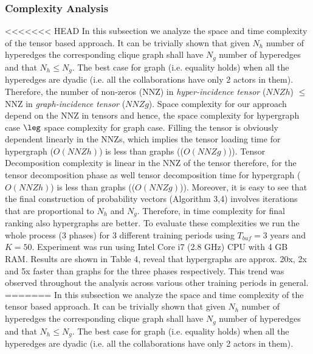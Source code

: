 \documentclass{sig-alternate}
\begin{document}

\subsubsection{Complexity Analysis}

<<<<<<< HEAD
In this subsection we analyze the space and time complexity of the tensor based approach. It can be trivially shown that given $N_h$ number of hyperedges the corresponding clique graph shall have $N_g$ number of hyperedges and that $N_h \leq N_g$. The best case for graph (i.e. equality holds) when all the hyperedges are dyadic (i.e. all the collaborations have only 2 actors in them). Therefore, the number of non-zeros (NNZ) in \textit{hyper-incidence tensor} ($NNZh$) $\leq$ NNZ in \textit{graph-incidence tensor} ($NNZg$). Space complexity for our approach depend on the NNZ in tensors and hence, the space complexity for hypergraph case $\leg$ space complexity for graph case. Filling the tensor is obviously dependent linearly in the NNZs, which implies the tensor loading time for hypergraph ($O(NNZh)$) is less than graphs (($O(NNZg)$)). Tensor Decomposition complexity is linear in the NNZ of the tensor \cite{kolda11} therefore, for the tensor decomposition phase as well tensor decomposition time for hypergraph ($O(NNZh)$) is less than graphs (($O(NNZg)$)). Moreover, it is easy to see that the final construction of probability vectors (Algorithm 3,4) involves iterations that are proportional to $N_h$ and $N_g$. Therefore, in time complexity for final ranking also hypergraphs are better. To evaluate these complexities we run the whole process (3 phases) for 3 different training periods using $T_{buf}=3$ years and $K=50$. Experiment was run using Intel Core i7 (2.8 GHz) CPU with 4 GB RAM. Results are shown in Table 4, reveal that hypergraphs are approx. 20x, 2x and 5x faster than graphs for the three phases respectively. This trend was observed throughout the analysis across various other training periods in general. 
=======
In this subsection we analyze the space and time complexity of the tensor based approach. It can be trivially shown that given $N_h$ number of hyperedges the corresponding clique graph shall have $N_g$ number of hyperedges and that $N_h \leq N_g$. The best case for graph (i.e. equality holds) when all the hyperedges are dyadic (i.e. all the collaborations have only 2 actors in them).
\end{document}
